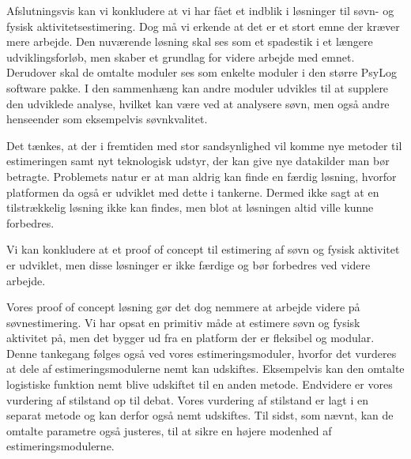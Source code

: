 Afslutningsvis kan vi konkludere at vi har fået et indblik i løsninger til søvn- og fysisk aktivitetsestimering.
Dog må vi erkende at det er et stort emne der kræver mere arbejde.
Den nuværende løsning skal ses som et spadestik i et længere udviklingsforløb, men skaber et grundlag for videre arbejde med emnet.
Derudover skal de omtalte moduler ses som enkelte moduler i den større PsyLog software pakke.
I den sammenhæng kan andre moduler udvikles til at supplere den udviklede analyse, hvilket kan være ved at analysere søvn, men også andre henseender som eksempelvis søvnkvalitet.

Det tænkes, at der i fremtiden med stor sandsynlighed vil komme nye metoder til estimeringen samt nyt teknologisk udstyr, der kan give nye datakilder man bør betragte.
Problemets natur er at man aldrig kan finde en færdig løsning, hvorfor platformen da også er udviklet med dette i tankerne.
Dermed ikke sagt at en tilstrækkelig løsning ikke kan findes, men blot at løsningen altid ville kunne forbedres.

Vi kan konkludere at et proof of concept til estimering af søvn og fysisk aktivitet er udviklet, men disse løsninger er ikke færdige og bør forbedres ved videre arbejde.

Vores proof of concept løsning gør det dog nemmere at arbejde videre på søvnestimering.
Vi har opsat en primitiv måde at estimere søvn og fysisk aktivitet på, men det bygger ud fra en platform der er fleksibel og modular.
Denne tankegang følges også ved vores estimeringsmoduler, hvorfor det vurderes at dele af estimeringsmodulerne nemt kan udskiftes.
Eksempelvis kan den omtalte logistiske funktion nemt blive udskiftet til en anden metode.
Endvidere er vores vurdering af stilstand op til debat. 
Vores vurdering af stilstand er lagt i en separat metode og kan derfor også nemt udskiftes. 
Til sidst, som nævnt, kan de omtalte parametre også justeres, til at sikre en højere modenhed af estimeringsmodulerne.



